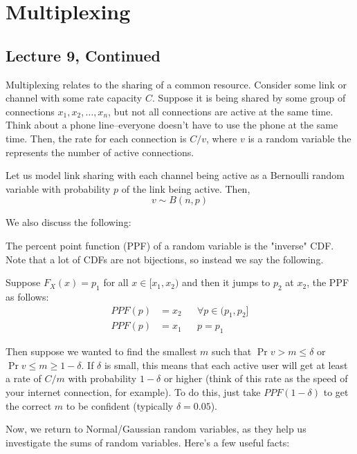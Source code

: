 \section{Multiplexing}

\subsection{Lecture 9, Continued}
Multiplexing relates to the sharing of a common resource. Consider some link or channel with some rate capacity $C$. Suppose it is
being shared by some group of connections $x_1, x_2, \dots, x_n$, but not all connections are active at the same time. Think
about a phone line--everyone doesn't have to use the phone at the same time. Then, the rate for each connection is
$C/v$, where $v$ is a random variable the represents the number of active connections.

Let us model link sharing with each channel being active as a Bernoulli random variable with probability $p$
of the link being active. Then,
\[ v \sim B(n, p) \]

We also discuss the following:
\begin{definition}[PPF]
    The percent point function (PPF) of a random variable is the "inverse" CDF. Note that a lot of CDFs are
    not bijections, so instead we say the following.

    Suppose $F_X(x) = p_1$ for all $x \in [x_1, x_2)$ and then it jumps to $p_2$ at $x_2$, the
    PPF as follows:
    \begin{align*}
        PPF(p) &= x_2 && \forall p \in (p_1, p_2] \\
        PPF(p) &= x_1 && p = p_1
    \end{align*}
\end{definition}

Then suppose we wanted to find the smallest $m$ such that $\Pr{v > m} \leq \delta$ or $\Pr{v \leq m} \geq 1 - \delta$.
If $\delta$ is small, this means that each active user will get at least
a rate of $C/m$ with probability $1 - \delta$ or higher (think of this rate as the speed of your internet connection,
for example). To do this,
just take $PPF(1 - \delta)$ to get the correct $m$ to be confident (typically $\delta = 0.05$).

Now, we return to Normal/Gaussian random variables, as they help us investigate the sums
of random variables. Here's a few useful facts:

